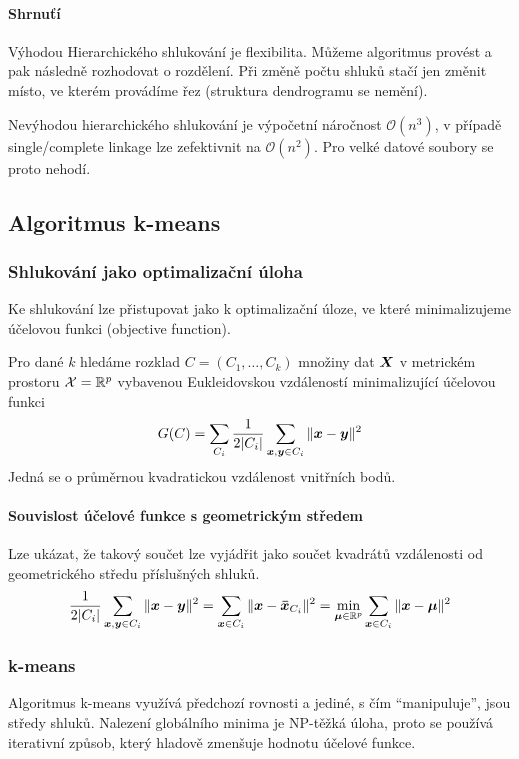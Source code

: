 \documentclass[../main.tex]{subfiles}
\begin{document}
\paragraph{Shrnuťí} Výhodou Hierarchického shlukování je flexibilita. Můžeme algoritmus provést a pak následně rozhodovat o rozdělení. Při změně počtu shluků stačí jen změnit místo, ve kterém provádíme řez (struktura dendrogramu se nemění).

Nevýhodou hierarchického shlukování je výpočetní náročnost $\mathcal{O}(n^3)$, v případě single/complete linkage lze zefektivnit na $\mathcal{O}(n^2)$. Pro velké datové soubory se proto nehodí.

\subsection{Algoritmus k-means}

\subsubsection{Shlukování jako optimalizační úloha}

Ke shlukování lze přistupovat jako k optimalizační úloze, ve které minimalizujeme účelovou funkci (objective function).

Pro dané $k$ hledáme rozklad $C = (C_1, \ldots, C_k)$ množiny dat $\bm{X}$ v metrickém prostoru $\mathcal{X} = \mathbb{R}^p$ vybavenou Eukleidovskou vzdáleností minimalizující účelovou funkci
\[
    G(C) = \sum_{C_i} \frac{1}{2 |C_i|} \sum_{\bm{x}, \bm{y} \in C_i} \|\bm{x} - \bm{y}\|^2
\]
Jedná se o průměrnou kvadratickou vzdálenost vnitřních bodů.

\paragraph{Souvislost účelové funkce s geometrickým středem}
Lze ukázat, že takový součet lze vyjádřit jako součet kvadrátů vzdálenosti od geometrického středu příslušných shluků.
\[
    \frac{1}{2 |C_i|} \sum_{\bm{x}, \bm{y} \in C_i} \|\bm{x} - \bm{y}\|^2
    = \sum_{\bm{x} \in C_i} \|\bm{x} - \bm{\bar{x}}_{C_i}\|^2
    = \min_{\bm{\mu} \in \mathbb{R}^p} \sum_{\bm{x} \in C_i} \|\bm{x} - \bm{\mu}\|^2
\]

\subsubsection{k-means}

Algoritmus k-means využívá předchozí rovnosti a jediné, s čím ``manipuluje'', jsou středy shluků. Nalezení globálního minima je NP-těžká úloha, proto se používá iterativní způsob, který hladově zmenšuje hodnotu účelové funkce.
\end{document}

